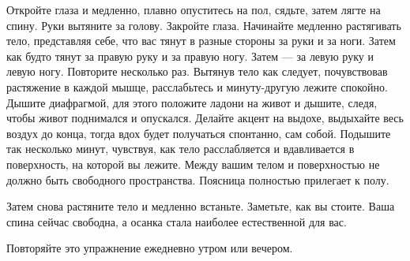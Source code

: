 Откройте глаза и медленно, плавно опуститесь на пол, сядьте, затем лягте на спину. Руки вытяните за голову. Закройте глаза. Начинайте медленно растягивать тело, представляя себе, что вас тянут в разные стороны за руки и за ноги. Затем как будто тянут за правую руку и за правую ногу. Затем --- за левую руку и левую ногу. Повторите несколько раз. Вытянув тело как следует, почувствовав растяжение в каждой мышце, расслабьтесь и минуту-другую лежите спокойно. Дышите диафрагмой, для этого положите ладони на живот и дышите, следя, чтобы живот поднимался и опускался. Делайте акцент на выдохе, выдыхайте весь воздух до конца, тогда вдох будет получаться спонтанно, сам собой. Подышите так несколько минут, чувствуя, как тело расслабляется
и вдавливается в поверхность, на которой вы лежите.
Между вашим телом и поверхностью не должно быть свободного пространства. Поясница полностью прилегает к полу.

Затем снова растяните тело и медленно встаньте. Заметьте, как вы стоите. Ваша спина сейчас свободна, а осанка стала наиболее естественной для вас.

Повторяйте это упражнение ежедневно утром или вечером.
\bye
